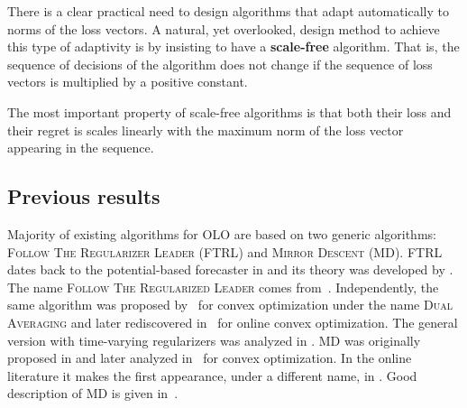
There is a clear practical need to design algorithms that adapt automatically
to norms of the loss vectors.  A natural, yet overlooked, design method to
achieve this type of adaptivity is by insisting to have a \textbf{scale-free}
algorithm.  That is, the sequence of decisions of the algorithm does not change
if the sequence of loss vectors is multiplied by a positive constant.


The most important property of scale-free algorithms is that both their loss
and their regret is scales linearly with the maximum norm of the loss vector
appearing in the sequence.

\subsection{Previous results}

Majority of existing algorithms for OLO are based on two generic algorithms:
\textsc{Follow The Regularizer Leader} (\textsc{FTRL}) and \textsc{Mirror
Descent} (\textsc{MD}). \textsc{FTRL} dates back to the potential-based
forecaster in \cite[Chapters~11]{Cesa-Bianchi-Lugosi-2006} and its theory was
developed by \cite{Shalev-Shwartz-2007}.  The name \textsc{Follow The
Regularized Leader} comes from~\cite{Abernethy-Hazan-Rakhlin-2008}.
Independently, the same algorithm was proposed by~\cite{Nestorov-2009} for
convex optimization under the name \textsc{Dual Averaging} and later
rediscovered in~\cite{Xiao-2010} for online convex optimization. The general
version with time-varying regularizers was analyzed in
\cite{Orabona-Crammer-Cesa-Bianchi-2014}. \textsc{MD} was originally proposed
in \cite{Nemirovski-Yudin-1983} and later analyzed in~\cite{Beck-Teboulle-2003}
for convex optimization. In the online literature it makes the first
appearance, under a different name, in \cite{Kivinen-Warmuth-1997}. Good
description of \textsc{MD} is given in~\cite{Rakhlin-Sridharan-2009}.

